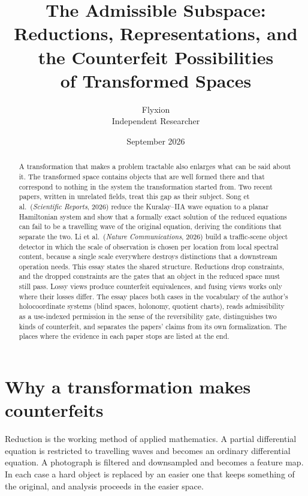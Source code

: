 \documentclass[11pt]{article}
\title{The Admissible Subspace:\\
Reductions, Representations, and the Counterfeit Possibilities\\
of Transformed Spaces}
\author{Flyxion\\\small Independent Researcher}
\date{September 2026}
\theoremstyle{definition}
\theoremstyle{remark}
\begin{document}
\maketitle

\begin{abstract}
\noindent
A transformation that makes a problem tractable also enlarges what can be said about it. The transformed space contains objects that are well formed there and that correspond to nothing in the system the transformation started from. Two recent papers, written in unrelated fields, treat this gap as their subject. Song et al.\ (\textit{Scientific Reports}, 2026) reduce the Kuralay--IIA wave equation to a planar Hamiltonian system and show that a formally exact solution of the reduced equations can fail to be a travelling wave of the original equation, deriving the conditions that separate the two. Li et al.\ (\textit{Nature Communications}, 2026) build a traffic-scene object detector in which the scale of observation is chosen per location from local spectral content, because a single scale everywhere destroys distinctions that a downstream operation needs. This essay states the shared structure. Reductions drop constraints, and the dropped constraints are the gates that an object in the reduced space must still pass. Lossy views produce counterfeit equivalences, and fusing views works only where their losses differ. The essay places both cases in the vocabulary of the author's holocoordinate systems (blind spaces, holonomy, quotient charts), reads admissibility as a use-indexed permission in the sense of the reversibility gate, distinguishes two kinds of counterfeit, and separates the papers' claims from its own formalization. The places where the evidence in each paper stops are listed at the end.
\end{abstract}

\section{Why a transformation makes counterfeits}

Reduction is the working method of applied mathematics. A partial differential equation is restricted to travelling waves and becomes an ordinary differential equation. A photograph is filtered and downsampled and becomes a feature map. In each case a hard object is replaced by an easier one that keeps something of the original, and analysis proceeds in the easier space.
\end{document}
